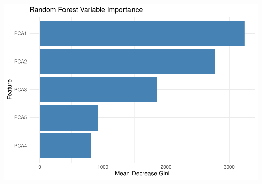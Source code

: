 \documentclass[
]{article}
\begin{document}
\includegraphics{veg_model_new_class_files/figure-latex/unnamed-chunk-17-3.pdf}
\end{document}
